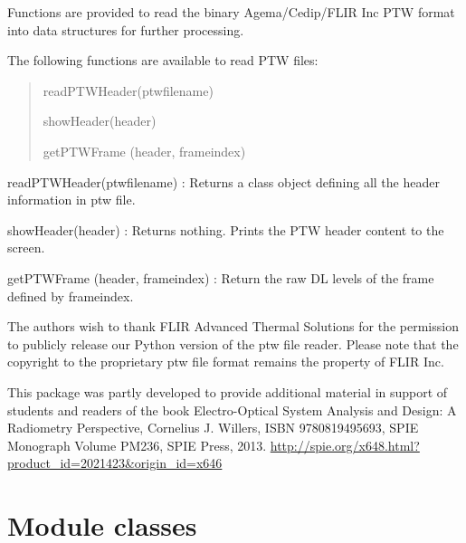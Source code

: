 \documentclass[a4paper,10pt,english]{sphinxmanual}
\begin{document}
Functions are provided to read the binary Agema/Cedip/FLIR Inc PTW format
into data structures for further processing.

The following functions are available to read PTW files:
\begin{quote}

\begin{DUlineblock}{0em}
\item[] readPTWHeader(ptwfilename)
\item[] showHeader(header)
\item[] getPTWFrame (header, frameindex)
\end{DUlineblock}
\end{quote}

readPTWHeader(ptwfilename) :
Returns a class object defining all the header information in ptw file.

showHeader(header) :
Returns nothing.  Prints the PTW header content to the screen.

getPTWFrame (header, frameindex) :
Return the raw DL levels of the frame defined by frameindex.

The authors wish to thank FLIR Advanced Thermal Solutions for the permission
to publicly release our Python version of the ptw file reader.  Please note that the
copyright to the proprietary ptw file format remains the property of FLIR Inc.

This package was partly developed to provide additional material in support of students
and readers of the book Electro-Optical System Analysis and Design: A Radiometry
Perspective,  Cornelius J. Willers, ISBN 9780819495693, SPIE Monograph Volume
PM236, SPIE Press, 2013.  \href{http://spie.org/x648.html?product\_id=2021423\&origin\_id=x646}{http://spie.org/x648.html?product\_id=2021423\&origin\_id=x646}


\section{Module classes}
\label{ryptw:module-classes}
\end{document}
